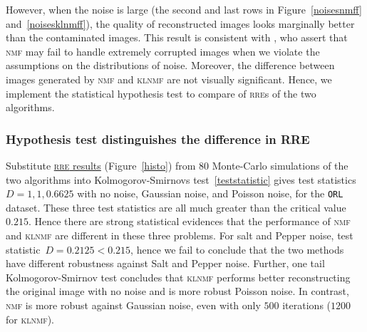 However, when the noise is large (the second and last rows in Figure~\ref{noisesnmff} and~\ref{noisesklnmff}), the quality of reconstructed images looks marginally better than the contaminated images.
This result is consistent with \citet{guan2017truncated}, who assert that \textsc{nmf} may fail to handle extremely corrupted images when we violate the assumptions on the distributions of noise.
Moreover, the difference between images generated by \textsc{nmf} and \textsc{klnmf} are not visually significant.
Hence, we implement the statistical hypothesis test to compare of \textsc{rre}s of the two algorithms.

\subsubsection{Hypothesis test distinguishes the difference in RRE}
Substitute \href{https://raw.githubusercontent.com/JoyceXinyueWang/nmf_raw_data/master/raw_result_acc.csv}{\textsc{rre} results} (Figure~\ref{histo}) from $80$ Monte-Carlo simulations of the two algorithms into Kolmogorov-Smirnovs test~\eqref{teststatistic} gives test statistics~$D=1, 1 ,0.6625$ with no noise, Gaussian noise, and Poisson noise, for the \texttt{ORL} dataset. These three test statistics are all much greater than the critical value~$0.215$. Hence there are strong statistical evidences that the performance of \textsc{nmf} and \textsc{klnmf} are different in these three problems. For salt and Pepper noise, test statistic~$D=0.2125<0.215$, hence we fail to conclude that the two methods have different robustness against Salt and Pepper noise. Further, one tail Kolmogorov-Smirnov test concludes that \textsc{klnmf} performs better reconstructing the original image with no noise and is more robust Poisson noise. 
In contrast, \textsc{nmf} is more robust against Gaussian noise, even with only $500$ iterations ($1200$ for \textsc{klnmf}).
